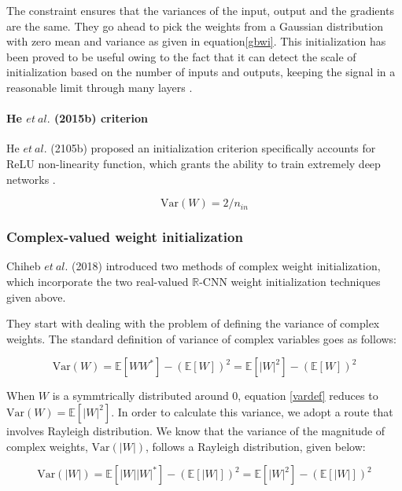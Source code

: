  The constraint ensures that the variances of the input, output and the gradients are the same. They go ahead to pick the weights from a Gaussian distribution with zero mean and variance as given in equation\ref{gbwi}. This initialization has been proved to be useful owing to the fact that it can detect the scale of initialization based on the number of inputs and outputs, keeping the signal in a reasonable limit through many layers \cite{recent_advances} \cite{glorot2010understanding}.
 
 
 \paragraph{He $et \ al.$ (2015b) criterion}
 He $et \ al.$ (2105b) proposed an initialization criterion specifically accounts for ReLU non-linearity function, which grants the ability to train extremely deep networks \cite{recent_advances} \cite{he2015delving}. 
 
 
 
 \begin{equation}\label{hewi}
 \mathrm{Var}(W) = 2/n_{in}
 \end{equation}
 \subsubsection{Complex-valued weight initialization}\label{cwi}
 Chiheb $et \ al.$ (2018) introduced two methods of complex weight initialization, which incorporate the two real-valued $\mathbb{R}$-CNN weight initialization techniques given above.
 
 They start with dealing with the problem of defining the variance of complex weights. The standard definition of variance of complex variables goes as follows:
 
 \begin{equation}\label{vardef}
 \mathrm{Var}(W) = \mathbb{E}[WW^{*}]-(\mathbb{E}[W])^2 = \mathbb{E}[|W|^{2}]-(\mathbb{E}[W])^2
 \end{equation}
 
 
 When $W$ is a symmtrically distributed around 0, equation \ref{vardef} reduces to $\mathrm{Var}(W) = \mathbb{E}[|W|^{2}]$. In order to calculate this variance, we adopt a route that involves Rayleigh distribution. We know that the variance of the magnitude of complex weights, $\mathrm{Var}(|W|)$, follows a Rayleigh distribution, given below:
 
 \begin{equation}\label{varmagrayleighdef}
 \mathrm{Var}(|W|) = \mathbb{E}[|W||W|^{*}]-(\mathbb{E}[|W|])^2 = \mathbb{E}[|W|^{2}]-(\mathbb{E}[|W|])^2
 \end{equation}
 
